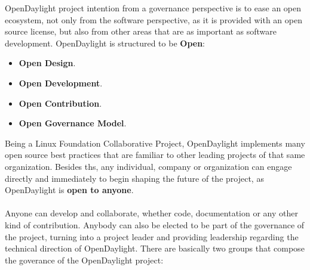 \documentclass[a4paper, 12pt]{book}
\begin{document}
OpenDaylight project intention from a governance perspective is to ease an open ecosystem, not only from the software perspective, as it is provided with an open source license, but also from other areas that are as important as software development. OpenDaylight is structured to be \textbf{Open}:
\begin{itemize}\itemsep0pt
\item{\textbf{Open Design}}.
\item{\textbf{Open Development}}.
\item{\textbf{Open Contribution}}.
\item{\textbf{Open Governance Model}}.
\end{itemize}
Being a Linux Foundation Collaborative Project, OpenDaylight implements many open source best practices that are familiar to other leading projects of that same organization. Besides ths, any individual, company or organization can engage directly and immediately to begin shaping the future of the project, as OpenDaylight is \textbf{open to anyone}.\\
\\
Anyone can develop and collaborate, whether code, documentation or any other kind of contribution. Anybody can also be elected to be part of the governance of the project, turning into a project leader and providing leadership regarding the technical direction of OpenDaylight. There are basically two groups that compose the goverance of the OpenDaylight project:
\end{document}
